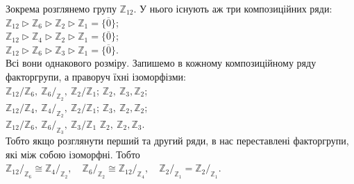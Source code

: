 \documentclass{math_library}
\begin{document}
\begin{example}
Зокрема розглянемо групу $\mathbb{Z}_{12}$. У нього існують аж три композиційних ряди:\\
$\mathbb{Z}_{12} \triangleright \mathbb{Z}_6 \triangleright \mathbb{Z}_2 \triangleright \mathbb{Z}_1 = \{\overline{0}\}$;\\
$\mathbb{Z}_{12} \triangleright \mathbb{Z}_4 \triangleright \mathbb{Z}_2 \triangleright \mathbb{Z}_1 = \{\overline{0}\}$;\\
$\mathbb{Z}_{12} \triangleright \mathbb{Z}_6 \triangleright \mathbb{Z}_3 \triangleright \mathbb{Z}_1 = \{\overline{0}\}$.\\
Всі вони однакового розміру. Запишемо в кожному композиційному ряду факторгрупи, а праворуч їхні ізоморфізми:\\
${\mathbb{Z}_{12}}/{\mathbb{Z}_6},\ {\mathbb{Z}_6}/_{\mathbb{Z}_2},\ {\mathbb{Z}_2}/{\mathbb{Z}_1}$; \qquad\qquad $\mathbb{Z}_2,\ \mathbb{Z}_3, \mathbb{Z}_2$;\\
${\mathbb{Z}_{12}}/{\mathbb{Z}_4},\ {\mathbb{Z}_4}/_{\mathbb{Z}_2},\ {\mathbb{Z}_2}/{\mathbb{Z}_1}$; \qquad\qquad $\mathbb{Z}_3,\ \mathbb{Z}_2, \mathbb{Z}_2$;\\
${\mathbb{Z}_{12}}/{\mathbb{Z}_6},\ {\mathbb{Z}_6}/_{\mathbb{Z}_3},\ {\mathbb{Z}_3}/{\mathbb{Z}_1}$ \qquad\qquad $\mathbb{Z}_2,\ \mathbb{Z}_2, \mathbb{Z}_3$.\\
Тобто якщо розглянути перший та другий ряди, в нас переставлені факторгрупи, які між собою ізоморфні. Тобто ${\mathbb{Z}_{12}}/_{\mathbb{Z}_6} \cong {\mathbb{Z}_{4}}/_{\mathbb{Z}_2},\quad {\mathbb{Z}_{6}}/_{\mathbb{Z}_2} \cong {\mathbb{Z}_{12}}/_{\mathbb{Z}_4},\quad {\mathbb{Z}_{2}}/_{\mathbb{Z}_1} = {\mathbb{Z}_{2}}/_{\mathbb{Z}_1}$.
\end{example}
\end{document}
